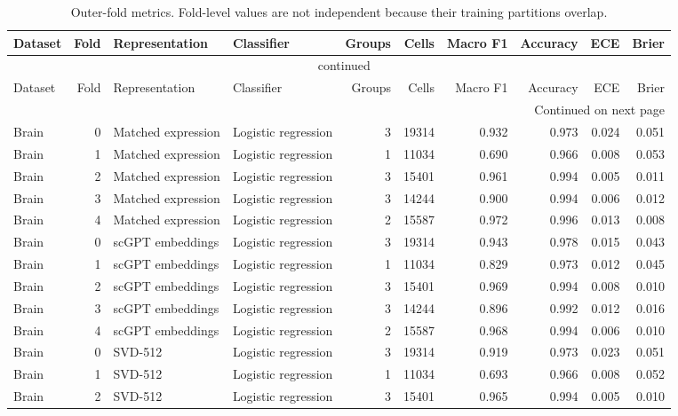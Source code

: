 {\footnotesize\setlength{\tabcolsep}{3pt}
\begin{longtable}{lrllrrrrrr}
\caption{Outer-fold metrics. Fold-level values are not independent because their training partitions overlap.}\label{tab:s-fold}\\
\toprule
Dataset & Fold & Representation & Classifier & Groups & Cells & Macro F1 & Accuracy & ECE & Brier \\
\midrule
\endfirsthead
\multicolumn{10}{c}{\tablename\ \thetable{} continued}\\
\toprule
Dataset & Fold & Representation & Classifier & Groups & Cells & Macro F1 & Accuracy & ECE & Brier \\
\midrule
\endhead
\midrule
\multicolumn{10}{r}{Continued on next page}\\
\endfoot
\bottomrule
\endlastfoot
Brain & 0 & Matched expression & Logistic regression & 3 & 19314 & 0.932 & 0.973 & 0.024 & 0.051 \\
Brain & 1 & Matched expression & Logistic regression & 1 & 11034 & 0.690 & 0.966 & 0.008 & 0.053 \\
Brain & 2 & Matched expression & Logistic regression & 3 & 15401 & 0.961 & 0.994 & 0.005 & 0.011 \\
Brain & 3 & Matched expression & Logistic regression & 3 & 14244 & 0.900 & 0.994 & 0.006 & 0.012 \\
Brain & 4 & Matched expression & Logistic regression & 2 & 15587 & 0.972 & 0.996 & 0.013 & 0.008 \\
Brain & 0 & scGPT embeddings & Logistic regression & 3 & 19314 & 0.943 & 0.978 & 0.015 & 0.043 \\
Brain & 1 & scGPT embeddings & Logistic regression & 1 & 11034 & 0.829 & 0.973 & 0.012 & 0.045 \\
Brain & 2 & scGPT embeddings & Logistic regression & 3 & 15401 & 0.969 & 0.994 & 0.008 & 0.010 \\
Brain & 3 & scGPT embeddings & Logistic regression & 3 & 14244 & 0.896 & 0.992 & 0.012 & 0.016 \\
Brain & 4 & scGPT embeddings & Logistic regression & 2 & 15587 & 0.968 & 0.994 & 0.006 & 0.010 \\
Brain & 0 & SVD-512 & Logistic regression & 3 & 19314 & 0.919 & 0.973 & 0.023 & 0.051 \\
Brain & 1 & SVD-512 & Logistic regression & 1 & 11034 & 0.693 & 0.966 & 0.008 & 0.052 \\
Brain & 2 & SVD-512 & Logistic regression & 3 & 15401 & 0.965 & 0.994 & 0.005 & 0.010 \\

\end{longtable}}
